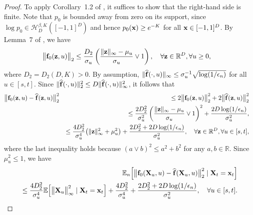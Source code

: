 \documentclass[11pt,a4paper,final]{article}
\numberwithin{equation}{section}
\theoremstyle{remark}
\def\cH{\mathcal H}
\newcommand{\bff}{{\bf f}}
\newcommand{\bx}{{\bf x}}
\newcommand{\bX}{{\bf X}}
\newcommand{\bz}{{\bf z}}
\newcommand{\bbE}{{\mathbb E}}
\newcommand{\bbR}{{\mathbb R}}
\newcommand{\bean}{\setlength\arraycolsep{1pt}\begin{eqnarray*}}
\newcommand{\eean}{\end{eqnarray*}}
\begin{document}
\begin{proof}
To apply Corollary~1.2 of \cite{bogachev2016distances}, it suffices to show that the right-hand side is finite.
Note that $p_{0}$ is bounded away from zero on its support, since $\log p_{0} \in \cH^{\beta,K}_{D}([-1,1]^{D})$ and hence $p_{0}(\bx) \geq e^{-K}$ for all $\bx \in [-1,1]^{D}$.
By Lemma~7 of \cite{kwon2026nonparametric}, we have
\bean
\big\| \bff_{0} (\bz, u) \big\|_2
\leq \frac{D_{2}}{\sigma_{u}} \left( \frac{\| \bz \|_{\infty} - \mu_{u}}{\sigma_{u}} \vee 1  \right),
\quad \forall \bz \in \bbR^{D}, \forall u \geq 0,
\eean
where $D_{2} = D_{2} ( D, K) > 0$.
By assumption, $\| \widehat \bff(\cdot,u) \|_{\infty} \leq \sigma_{u}^{-1} \sqrt{ \log (1/\epsilon_n) }$ for all $u \in [s,t]$.
Since $\| \widehat \bff(\cdot,u) \|_{2}^2 \leq D \| \widehat \bff(\cdot,u) \|_{\infty}^2$, it follows that
\bean
\big\| \bff_{0} (\bz, u) - \widehat \bff (\bz, u) \big\|_2^2 
&& \leq 2 \big\| \bff_{0} (\bz, u) \big\|_2^2 + 2 \big\| \widehat \bff (\bz, u) \big\|_2^2 
\\
&& \leq  \frac{2 D_{2}^2}{\sigma_{u}^2} \left( \frac{\| \bz \|_{\infty} - \mu_{u}}{\sigma_{u}} \vee 1  \right)^2
+ \frac{2 D \log ( 1 / \epsilon_n ) }{\sigma_{u}^2},
\\
&& \leq 
\frac{4 D_{2}^2 }{\sigma_{u}^4} \big( \| \bz \|_{\infty}^2 +  \mu_{u}^2 \big)
+ \frac{2 D_{2}^2 + 2 D \log (1/\epsilon_n) }{\sigma_{u}^2},
\quad \forall \bz \in \bbR^{D}, \forall u \in [s,t],
\eean
where the last inequality holds because $(a \vee b)^2 \leq a^2 + b^2$ for any $a,b \in \bbR$.
Since $\mu_{u}^2 \leq 1$, we have
\bean
&& \bbE_{n} \Big[
\big\| \bff_{0}( \bX_{u} ,u) - \widehat \bff( \bX_{u} ,u ) \big\|_2^2 \mid \bX_{t} = \bx_{t} \Big]
\\
&& \leq \frac{4 D_{2}^2 }{\sigma_{u}^4} 
\bbE \Big[
\big\|  \bX_{u} \big\|_{\infty}^2 \mid \bX_{t} = \bx_{t} \Big]
+ \frac{4 D_{2}^2}{\sigma_{u}^4} + \frac{2 D_{2}^2 + 2 D \log (1/\epsilon_n) }{\sigma_{u}^2},
\quad \forall u \in [s,t].
\eean


\end{proof}
\end{document}
